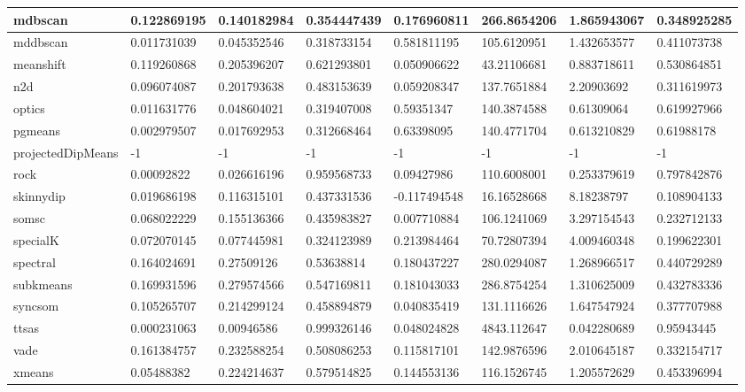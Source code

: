 \begin{table}[H]
\begin{tabular}{|l|l|l|l|l|l|l|l|}
\hline
mdbscan & 0.122869195 & 0.140182984 & 0.354447439 & 0.176960811 & 266.8654206 & 1.865943067 & 0.348925285 \\
\hline
mddbscan & 0.011731039 & 0.045352546 & 0.318733154 & 0.581811195 & 105.6120951 & 1.432653577 & 0.411073738 \\
\hline
meanshift & 0.119260868 & 0.205396207 & 0.621293801 & 0.050906622 & 43.21106681 & 0.883718611 & 0.530864851 \\
\hline
n2d & 0.096074087 & 0.201793638 & 0.483153639 & 0.059208347 & 137.7651884 & 2.20903692 & 0.311619973 \\
\hline
optics & 0.011631776 & 0.048604021 & 0.319407008 & 0.59351347 & 140.3874588 & 0.61309064 & 0.619927966 \\
\hline
pgmeans & 0.002979507 & 0.017692953 & 0.312668464 & 0.63398095 & 140.4771704 & 0.613210829 & 0.61988178 \\
\hline
projectedDipMeans & -1 & -1 & -1 & -1 & -1 & -1 & -1 \\
\hline
rock & 0.00092822 & 0.026616196 & 0.959568733 & 0.09427986 & 110.6008001 & 0.253379619 & 0.797842876 \\
\hline
skinnydip & 0.019686198 & 0.116315101 & 0.437331536 & -0.117494548 & 16.16528668 & 8.18238797 & 0.108904133 \\
\hline
somsc & 0.068022229 & 0.155136366 & 0.435983827 & 0.007710884 & 106.1241069 & 3.297154543 & 0.232712133 \\
\hline
specialK & 0.072070145 & 0.077445981 & 0.324123989 & 0.213984464 & 70.72807394 & 4.009460348 & 0.199622301 \\
\hline
spectral & 0.164024691 & 0.27509126 & 0.53638814 & 0.180437227 & 280.0294087 & 1.268966517 & 0.440729289 \\
\hline
subkmeans & 0.169931596 & 0.279574566 & 0.547169811 & 0.181043033 & 286.8754254 & 1.310625009 & 0.432783336 \\
\hline
syncsom & 0.105265707 & 0.214299124 & 0.458894879 & 0.040835419 & 131.1116626 & 1.647547924 & 0.377707988 \\
\hline
ttsas & 0.000231063 & 0.00946586 & 0.999326146 & 0.048024828 & 4843.112647 & 0.042280689 & 0.95943445 \\
\hline
vade & 0.161384757 & 0.232588254 & 0.508086253 & 0.115817101 & 142.9876596 & 2.010645187 & 0.332154717 \\
\hline
xmeans & 0.05488382 & 0.224214637 & 0.579514825 & 0.144553136 & 116.1526745 & 1.205572629 & 0.453396994 \\
\hline
\end{tabular}
\end{table}

\clearpage

